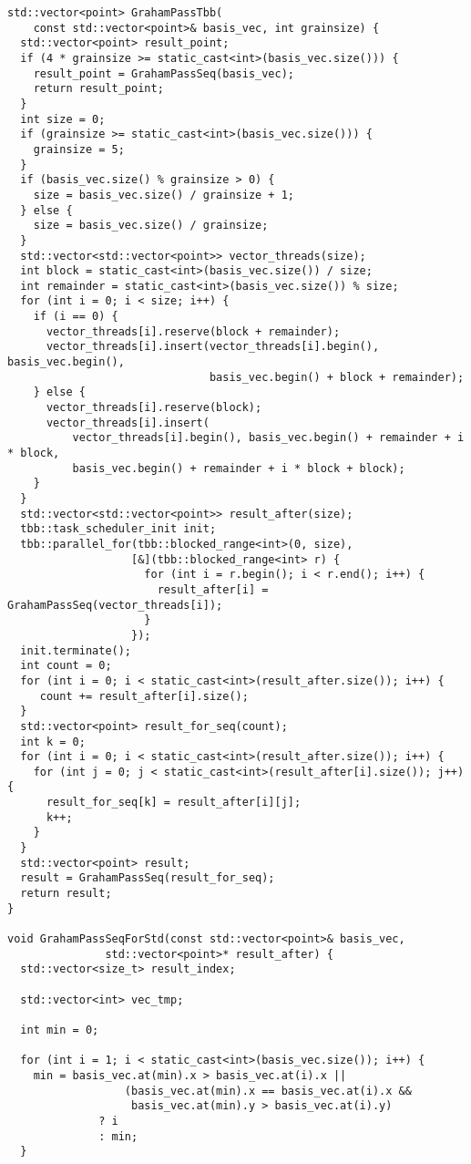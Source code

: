 \documentclass{report}
\begin{document}
\begin{lstlisting}
std::vector<point> GrahamPassTbb(
    const std::vector<point>& basis_vec, int grainsize) {
  std::vector<point> result_point;
  if (4 * grainsize >= static_cast<int>(basis_vec.size())) {
    result_point = GrahamPassSeq(basis_vec);
    return result_point;
  }
  int size = 0;
  if (grainsize >= static_cast<int>(basis_vec.size())) {
    grainsize = 5;
  }
  if (basis_vec.size() % grainsize > 0) {
    size = basis_vec.size() / grainsize + 1;
  } else {
    size = basis_vec.size() / grainsize;
  }
  std::vector<std::vector<point>> vector_threads(size);
  int block = static_cast<int>(basis_vec.size()) / size;
  int remainder = static_cast<int>(basis_vec.size()) % size;
  for (int i = 0; i < size; i++) {
    if (i == 0) {
      vector_threads[i].reserve(block + remainder);
      vector_threads[i].insert(vector_threads[i].begin(), basis_vec.begin(),
                               basis_vec.begin() + block + remainder);
    } else {
      vector_threads[i].reserve(block);
      vector_threads[i].insert(
          vector_threads[i].begin(), basis_vec.begin() + remainder + i * block,
          basis_vec.begin() + remainder + i * block + block);
    }
  }
  std::vector<std::vector<point>> result_after(size);
  tbb::task_scheduler_init init;
  tbb::parallel_for(tbb::blocked_range<int>(0, size),
                   [&](tbb::blocked_range<int> r) {
                     for (int i = r.begin(); i < r.end(); i++) {
                       result_after[i] = GrahamPassSeq(vector_threads[i]);
                     }
                   });
  init.terminate();
  int count = 0;
  for (int i = 0; i < static_cast<int>(result_after.size()); i++) {
     count += result_after[i].size();
  }
  std::vector<point> result_for_seq(count);
  int k = 0;
  for (int i = 0; i < static_cast<int>(result_after.size()); i++) {
    for (int j = 0; j < static_cast<int>(result_after[i].size()); j++) {
      result_for_seq[k] = result_after[i][j];
      k++;
    }
  }
  std::vector<point> result;
  result = GrahamPassSeq(result_for_seq);
  return result;
}

void GrahamPassSeqForStd(const std::vector<point>& basis_vec,
               std::vector<point>* result_after) {
  std::vector<size_t> result_index;

  std::vector<int> vec_tmp;

  int min = 0;

  for (int i = 1; i < static_cast<int>(basis_vec.size()); i++) {
    min = basis_vec.at(min).x > basis_vec.at(i).x ||
                  (basis_vec.at(min).x == basis_vec.at(i).x &&
                   basis_vec.at(min).y > basis_vec.at(i).y)
              ? i
              : min;
  }


\end{lstlisting}
\end{document}
